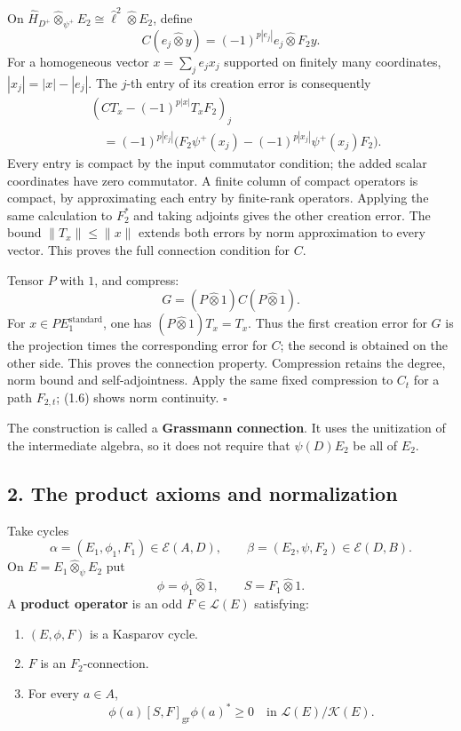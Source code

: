\documentclass[
  11pt,
]{article}
\providecommand{\tightlist}{%
  \setlength{\itemsep}{0pt}\setlength{\parskip}{0pt}}
\begin{document}
On \(\widehat H_{D^+}\widehat\otimes_{\psi^+}E_2
\cong\widehat\ell^2\widehat\otimes E_2\), define \[
C(e_j\widehat\otimes y)
=(-1)^{p|e_j|}e_j\widehat\otimes F_2y.
\tag{1.6}
\] For a homogeneous vector \(x=\sum_j e_jx_j\) supported on finitely
many coordinates, \(|x_j|=|x|-|e_j|\). The \(j\)-th entry of its
creation error is consequently \[
\begin{aligned}
&(CT_x-(-1)^{p|x|}T_xF_2)_j\\
&\quad=(-1)^{p|e_j|}
 \bigl(F_2\psi^+(x_j)-(-1)^{p|x_j|}\psi^+(x_j)F_2\bigr).
\end{aligned}
\] Every entry is compact by the input commutator condition; the added
scalar coordinates have zero commutator. A finite column of compact
operators is compact, by approximating each entry by finite-rank
operators. Applying the same calculation to \(F_2^*\) and taking
adjoints gives the other creation error. The bound \(\|T_x\|\leq\|x\|\)
extends both errors by norm approximation to every vector. This proves
the full connection condition for \(C\).

Tensor \(P\) with \(1\), and compress: \[
G=(P\widehat\otimes1)C(P\widehat\otimes1).
\tag{1.7}
\] For \(x\in PE_1^{\mathrm{standard}}\), one has
\((P\widehat\otimes1)T_x=T_x\). Thus the first creation error for \(G\)
is the projection times the corresponding error for \(C\); the second is
obtained on the other side. This proves the connection property.
Compression retains the degree, norm bound and self-adjointness. Apply
the same fixed compression to \(C_t\) for a path \(F_{2,t}\); (1.6)
shows norm continuity. \(\square\)

The construction is called a \textbf{Grassmann connection}. It uses the
unitization of the intermediate algebra, so it does not require that
\(\psi(D)E_2\) be all of \(E_2\).

\subsection{2. The product axioms and
normalization}\label{the-product-axioms-and-normalization}

Take cycles \[
\alpha=(E_1,\phi_1,F_1)\in\mathcal E(A,D),\qquad
\beta=(E_2,\psi,F_2)\in\mathcal E(D,B).
\] On \(E=E_1\widehat\otimes_\psi E_2\) put \[
\phi=\phi_1\widehat\otimes1,\qquad S=F_1\widehat\otimes1.
\] A \textbf{product operator} is an odd \(F\in\mathcal L(E)\)
satisfying:

\begin{enumerate}
\def\labelenumi{\arabic{enumi}.}
\tightlist
\item
  \((E,\phi,F)\) is a Kasparov cycle.
\item
  \(F\) is an \(F_2\)-connection.
\item
  For every \(a\in A\), \[
  \phi(a)[S,F]_{\mathrm{gr}}\phi(a)^*\geq0
  \quad\text{in }\mathcal L(E)/\mathcal K(E).
  \tag{2.1}
  \]
\end{enumerate}
\end{document}
